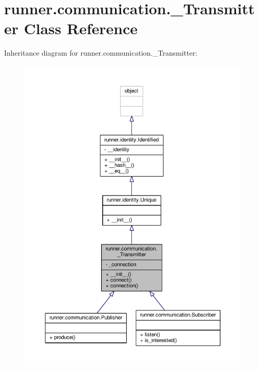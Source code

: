 \hypertarget{classrunner_1_1communication_1_1__Transmitter}{}\section{runner.\+communication.\+\_\+\+Transmitter Class Reference}
\label{classrunner_1_1communication_1_1__Transmitter}


Inheritance diagram for runner.\+communication.\+\_\+\+Transmitter\+:
\nopagebreak
\begin{figure}[H]
\begin{center}
\leavevmode
\includegraphics[width=350pt]{classrunner_1_1communication_1_1__Transmitter__inherit__graph}
\end{center}
\end{figure}


